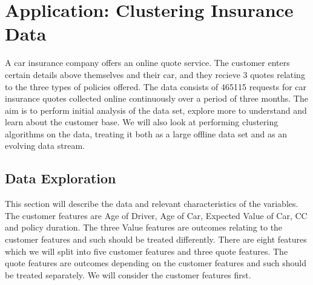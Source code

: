 
\graphicspath{{Chapter3/figures/}} 


\chapter{Application: Clustering Insurance Data}
\label{chap:datasets}

A car insurance company offers an online quote service. The customer enters certain details above themselves and their car, and they recieve 3 quotes relating to the three types of policies offered. The data consists of 465115 requests for car insurance quotes collected online continuously over a period of three months. The aim is to perform initial analysis of the data set, explore more to understand and learn about the customer base. We will also look at performing clustering algorithms on the data, treating it both as a large offline data set and as an evolving data stream. 

\section{Data Exploration}
 
This section will describe the data and relevant characteristics of the variables. The customer features are Age of Driver, Age of Car, Expected Value of Car, CC and policy duration. The three Value features are outcomes relating to the customer features and such should be treated differently. There are eight features which we will split into five customer features and three quote features. The quote features are outcomes depending on the customer features and such should be treated separately. We will consider the customer features first.

